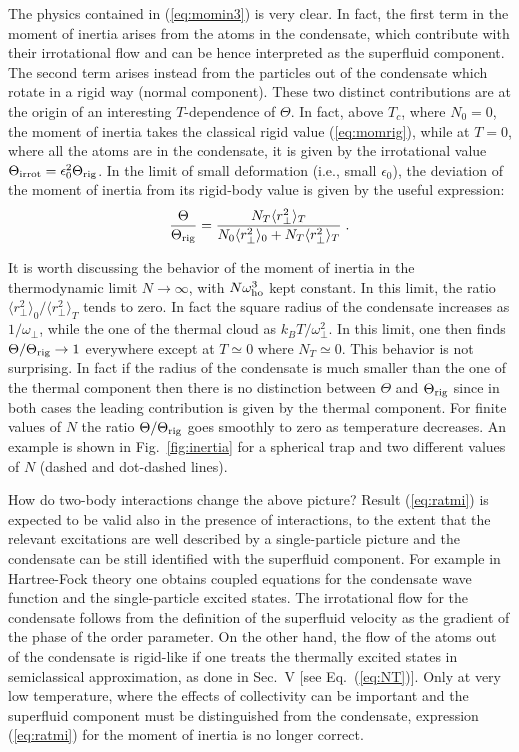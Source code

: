 The physics contained in (\ref{eq:momin3}) is very clear. In fact, 
the first term in the moment of inertia arises from the atoms in the 
condensate, which contribute with their irrotational flow and can be
hence interpreted as the superfluid component. The second term arises
instead from the particles out of the condensate which rotate in a rigid
way (normal component).  These two distinct contributions are at the 
origin of an interesting $T$-dependence of $\Theta$. In fact, above $T_c$,
where $N_0 = 0$, the moment of inertia takes the classical rigid
value (\ref{eq:momrig}), while at $T=0$, where all the atoms are in
the condensate, it is given by the irrotational value $\Theta_{\rm irrot}
= \epsilon_0^2\Theta_{\rm rig}$. In the limit of small deformation
(i.e., small $\epsilon_0 $), the deviation of the moment of inertia
from its rigid-body value is given by the useful expression:
\begin{equation}
\frac{\Theta}{\Theta_{\rm rig}} = \frac{N_T \langle r_\perp^2\rangle_{T}}
{N_0 \langle r_\perp^2\rangle_0 + N_T \langle r_\perp^2
\rangle_{T}} \;.
\label{eq:ratmi}
\end{equation}

It is worth discussing the behavior of the moment of inertia in the
thermodynamic limit $N\to \infty$, with $N\omega_{\rm ho}^3$ kept constant.
In this limit, the ratio $\langle r_\perp^2\rangle_0/\langle r_\perp^2
\rangle_{T}$ tends to zero.  In fact the square radius of the condensate
increases as $1/\omega_\perp$, while the one of the thermal cloud as
$k_B T/\omega_\perp^2$. In this limit, one then finds $\Theta/
\Theta_{\rm rig}\to 1$ everywhere except at $T\simeq 0$ where $N_T\simeq 0$.
This behavior is not surprising. In  fact if the radius of the
condensate is much smaller than the one of the thermal component then there
is no distinction between $\Theta$ and $\Theta_{\rm rig}$ since in both cases
the leading contribution is given by the thermal component. For finite 
values of $N$ the ratio $\Theta/\Theta_{\rm rig}$ goes smoothly to zero
as temperature decreases. An example is shown in Fig.~\ref{fig:inertia}
for a spherical trap and two different values of $N$ (dashed and
dot-dashed lines).  

How do two-body interactions change the above picture? Result
(\ref{eq:ratmi}) is expected to be valid also in the presence of 
interactions,  to the extent that the relevant excitations are 
well described by a single-particle picture and  the condensate can be
still identified with
the superfluid component.  For example in Hartree-Fock theory one
obtains coupled equations for the condensate wave function and
the single-particle excited states. The irrotational flow for the
condensate follows from the definition of the superfluid velocity
as the gradient of the phase of the order parameter.  On the other
hand, the flow of the atoms out of the condensate is rigid-like if
one treats the thermally excited states in semiclassical approximation,
as done in Sec.~V [see Eq.~(\ref{eq:NT})].  Only at very low temperature,
where the effects of collectivity can be important and  the superfluid
component must be distinguished from the condensate, expression
(\ref{eq:ratmi}) for the moment of inertia is no longer correct.

